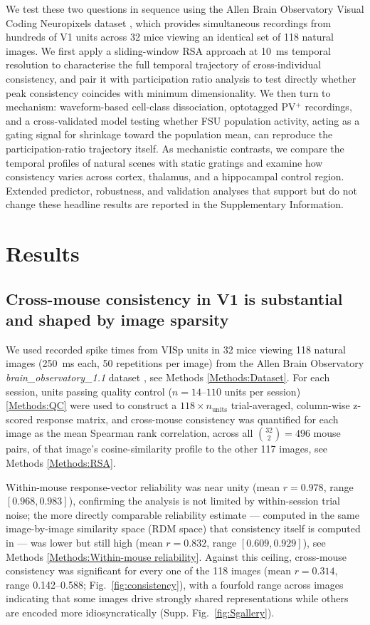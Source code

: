 \documentclass[11pt,onecolumn]{article}
\begin{document}
We test these two questions in sequence using the Allen Brain Observatory
Visual Coding Neuropixels dataset \citep{siegle2021}, which provides
simultaneous recordings from hundreds of V1 units across 32 mice viewing an
identical set of 118 natural images. We first apply a sliding-window RSA
approach at 10~ms temporal resolution to characterise the full temporal
trajectory of cross-individual consistency, and pair it with participation
ratio analysis to test directly whether peak consistency coincides with
minimum dimensionality. We then turn to mechanism: waveform-based
cell-class dissociation, optotagged PV$^+$ recordings, and a cross-validated
model testing whether FSU population activity, acting as a gating signal
for shrinkage toward the population mean, can reproduce the
participation-ratio trajectory itself. As mechanistic contrasts, we 
compare the temporal profiles of natural scenes with static gratings 
and examine how consistency varies
across cortex, thalamus, and a hippocampal control region. Extended 
predictor, robustness, and validation
analyses that support but do not change these headline results are
reported in the Supplementary Information.

\section{Results}

\subsection{Cross-mouse consistency in V1 is substantial and shaped by
image sparsity}

We used recorded spike times from VISp units in 32 mice viewing 118 natural
images (250~ms each, 50 repetitions per image) from the Allen Brain
Observatory \textit{brain\_observatory\_1.1} dataset \citep{siegle2021}, 
see Methods \ref{Methods:Dataset}.
For each session, units passing quality control ($n = 14$--$110$ units per
session) \ref{Methods:QC} were used to construct a $118 \times n_\mathrm{units}$
trial-averaged, column-wise z-scored response matrix, and cross-mouse
consistency was quantified for each image as the mean Spearman rank
correlation, across all $\binom{32}{2} = 496$ mouse pairs, of that image's
cosine-similarity profile to the other 117 images, see Methods \ref{Methods:RSA}.

Within-mouse response-vector reliability was near unity (mean $r = 0.978$,
range $[0.968, 0.983]$), confirming the analysis is not limited by
within-session trial noise; the more directly comparable reliability
estimate --- computed in the same image-by-image similarity space (RDM
space) that consistency itself is computed in --- was lower but still high
(mean $r = 0.832$, range $[0.609, 0.929]$), see Methods 
\ref{Methods:Within-mouse reliability}. Against this ceiling,
cross-mouse consistency was significant for every one of the 118 images
(mean $r = 0.314$, range 0.142--0.588; Fig.~\ref{fig:consistency}), with a
fourfold range across images indicating that some images drive strongly
shared representations while others are encoded more idiosyncratically 
(Supp. Fig.~\ref{fig:Sgallery}).
\end{document}
